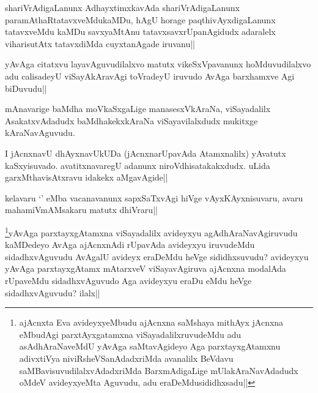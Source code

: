 
\begin{artha}
shariVrAdigaLanunx AdhayxtimxkavAda shariVrAdigaLanunx paramAthaRtatavxveMdukaMDu, hAgU horage paqthivAyxdigaLanunx tatavxveMdu kaMDu savxyaMtAnu tatavxsavxrUpanAgidudx adaralelx viharisutAtx tatavxdiMda cuyxtanAgade iruvanu||
\end{artha}


\begin{artha}
yAvAga citatxvu layavAguvudilalxvo matutx vikeSxVpavanunx hoMduvudilalxvo adu calisadeyU viSayAkAravAgi toVradeyU iruvudo AvAga barxhamxve Agi biDuvudu||
\end{artha}


\begin{artha}
mAnavarige baMdha moVkaSxgaLige manasesxVkAraNa, viSayadalilx AsakatxvAdadudx baMdhakekxkAraNa viSayavilalxdudx mukitxge kAraNavAguvudu.
\end{artha}


\begin{artha}
I jAcnxnavU dhAyxnavUkUDa (jAcnxnarUpavAda Atamxnalilx) yAvatutx kaSxyisuvado. avatitxnavaregU adanunx niroVdhisatakakxdudx. uLida garxMthavisAtxravu idakekx aMgavAgide||
\end{artha}


\begin{artha}
kelavaru `\stext' eMba vacanavanunx sapxSaTxvAgi hiVge vAyxKAyxnisuvaru, avaru mahamiVmAMsakaru matutx dhiVraru||
\end{artha}


\begin{artha}
\footnote{ajAcnxta Eva avideyxyeMbudu ajAcnxna saMshaya mithAyx jAcnxna eMbudAgi parxtAyxgatamxna viSayadalilxruvudeMdu adu asAdhAraNaveMdU yAvAga saMtavAgideyo Aga parxtayxgAtamxnu adivxtiVya niviRsheVSanAdadxriMda avanalilx BeVdavu saMBavisuvudilalxvAdadxriMda BarxmAdigaLige mUlakAraNavAdadudx oMdeV avideyxyeMta Aguvudu, adu eraDeMdusididhxsadu||}yAvAga parxtayxgAtamxna viSayadalilx avideyxyu agAdhAraNavAgiruvudu kaMDedeyo AvAga ajAcnxnAdi rUpavAda avideyxyu iruvudeMdu sidadhxvAguvudu AvAgalU avideyx eraDeMdu heVge sididhxsuvudu? avideyxyu yAvAga parxtayxgAtamx mAtarxveV viSayavAgiruva ajAcnxna modalAda rUpaveMdu sidadhxvAguvudo Aga avideyxyu eraDu eMdu heVge sidadhxvAguvudu? ilalx||
\end{artha}

